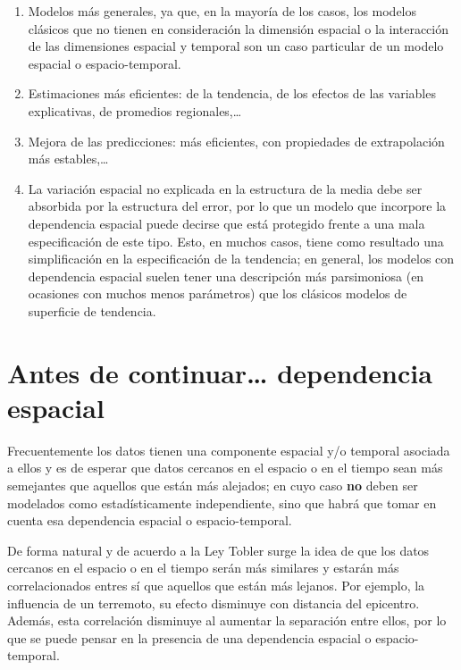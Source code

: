 \documentclass[
]{book}
\theoremstyle{definition}
\theoremstyle{definition}
\theoremstyle{definition}
\theoremstyle{definition}
\theoremstyle{remark}
\begin{document}
\begin{enumerate}
\def\labelenumi{\arabic{enumi}.}
\item
  Modelos más generales, ya que, en la mayoría de los casos, los modelos
  clásicos que no tienen en consideración la dimensión espacial o la
  interacción de las dimensiones espacial y temporal son un caso particular de
  un modelo espacial o espacio-temporal.
\item
  Estimaciones más eficientes: de la tendencia, de los efectos de las
  variables explicativas, de promedios regionales,\ldots{}
\item
  Mejora de las predicciones: más eficientes, con propiedades de extrapolación
  más estables,\ldots{}
\item
  La variación espacial no explicada en la estructura de la media debe ser
  absorbida por la estructura del error, por lo que un modelo que incorpore la
  dependencia espacial puede decirse que está protegido frente a una mala
  especificación de este tipo. Esto, en muchos casos, tiene como resultado una
  simplificación en la especificación de la tendencia; en general, los modelos
  con dependencia espacial suelen tener una descripción más parsimoniosa (en
  ocasiones con muchos menos parámetros) que los clásicos modelos de
  superficie de tendencia.
\end{enumerate}

\hypertarget{antes-de-continuar-dependencia-espacial}{%
\section{Antes de continuar\ldots{} dependencia espacial}\label{antes-de-continuar-dependencia-espacial}}

Frecuentemente los datos tienen una componente espacial y/o temporal asociada a
ellos y es de esperar que datos cercanos en el espacio o en el tiempo sean más
semejantes que aquellos que están más alejados; en cuyo caso \textbf{no} deben ser
modelados como estadísticamente independiente, sino que habrá que tomar en
cuenta esa dependencia espacial o espacio-temporal.

De forma natural y de acuerdo a la Ley Tobler \citep{tobler1970} surge la idea de que
los datos cercanos en el espacio o en el tiempo serán más similares y estarán
más correlacionados entres sí que aquellos que están más lejanos. Por ejemplo,
la influencia de un terremoto, su efecto disminuye con distancia del epicentro.
Además, esta correlación disminuye al aumentar la separación entre ellos, por lo
que se puede pensar en la presencia de una dependencia espacial o
espacio-temporal.
\end{document}
